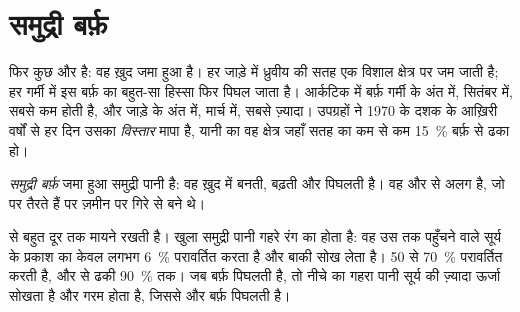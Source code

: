\section{समुद्री बर्फ़}

 फिर कुछ और है: वह ख़ुद जमा हुआ  है। हर जाड़े में ध्रुवीय  की
सतह एक विशाल क्षेत्र पर जम जाती है; हर गर्मी में इस बर्फ़ का बहुत-सा हिस्सा फिर पिघल
जाता है। आर्कटिक में बर्फ़ गर्मी के अंत में, सितंबर में, सबसे कम होती है, और जाड़े के
अंत में, मार्च में, सबसे ज़्यादा। उपग्रहों ने 1970 के दशक के आख़िरी वर्षों से हर दिन
उसका \emph{विस्तार} मापा है, यानी  का वह क्षेत्र जहाँ सतह का कम से कम 15~\%
बर्फ़ से ढका हो।

\begin{definition}[समुद्री बर्फ़]\label{def:g8:ice-on-earth:sea-ice}
\emph{समुद्री बर्फ़} जमा हुआ समुद्री पानी है: वह ख़ुद  में
बनती, बढ़ती और पिघलती है। वह  और  से अलग है, जो  पर तैरते
हैं पर ज़मीन पर गिरे  से बने थे।
\end{definition}

  से बहुत दूर तक मायने रखती है। खुला समुद्री पानी गहरे रंग का होता है:
वह उस तक पहुँचने वाले सूर्य के प्रकाश का केवल लगभग 6~\% परावर्तित करता है और बाकी
सोख लेता है।  50 से 70~\% परावर्तित करती है, और  से ढकी 
90~\% तक। जब बर्फ़ पिघलती है, तो नीचे का गहरा पानी सूर्य की ज़्यादा ऊर्जा सोखता है और
गरम होता है, जिससे और बर्फ़ पिघलती है।

